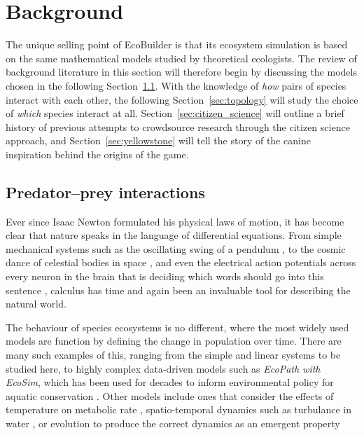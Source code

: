 \section{Background}
\label{sec:joy_background}
The unique selling point of EcoBuilder is that its ecosystem simulation is based on the same mathematical models studied by theoretical ecologists. The review of background literature in this section will therefore begin by discussing the models chosen in the following Section~\ref{sec:predator_prey}. With the knowledge of \emph{how} pairs of species interact with each other, the following Section~\ref{sec:topology} will study the choice of \emph{which} species interact at all. Section~\ref{sec:citizen_science} will outline a brief history of previous attempts to crowdsource research through the citizen science approach, and Section~\ref{sec:yellowstone} will tell the story of the canine inspiration behind the origins of the game.

\subsection{Predator--prey interactions}
\label{sec:predator_prey}
Ever since Isaac Newton formulated his physical laws of motion, it has become clear that nature speaks in the language of differential equations. From simple mechanical systems such as the oscillating swing of a pendulum \cite{Fulcher1976}, to the cosmic dance of celestial bodies in space \cite{Marchal2012}, and even the electrical action potentials across every neuron in the brain that is deciding which words should go into this sentence \cite{Hodgkin1952}, calculus has time and again been an invaluable tool for describing the natural world. 

The behaviour of species ecosystems is no different, where the most widely used models are function by defining the change in population over time.
There are many such examples of this, ranging from the simple and linear systems to be studied here, to highly complex data-driven models such as \emph{EcoPath with EcoSim}, which has been used for decades to inform environmental policy for aquatic conservation \cite{Christensen2004}.
Other models include ones that consider the effects of temperature on metabolic rate \cite{Savage2004, Dell2014},  spatio-temporal dynamics such as turbulance in water \cite{Watteaux2015}, or evolution to produce the correct dynamics as an emergent property \cite{Laird2008}

